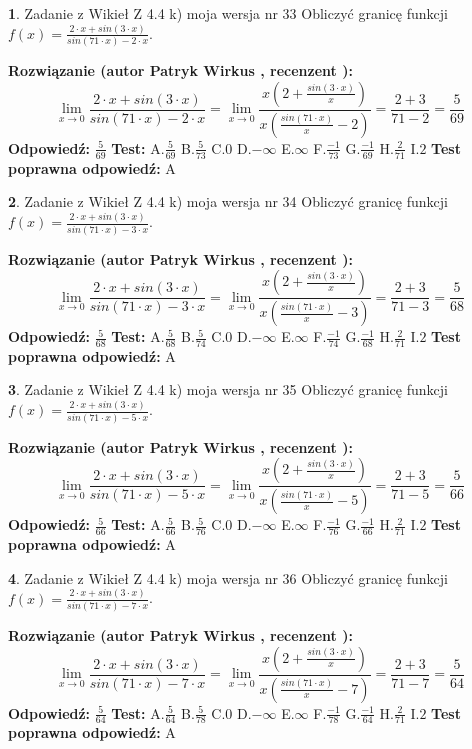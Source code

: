 \documentclass[12pt, a4paper]{article}
\theoremstyle{definition} %
\newtheorem{zad}{}
\newcommand{\zadStart}[1]{\begin{zad}#1\newline}
\newcommand{\zadStop}{\end{zad}}
\newcommand{\rozwStart}[2]{\noindent \textbf{Rozwiązanie (autor #1 , recenzent #2): }\newline}
\newcommand{\rozwStop}{\newline}
\newcommand{\odpStart}{\noindent \textbf{Odpowiedź:}\newline}
\newcommand{\odpStop}{\newline}
\newcommand{\testStart}{\noindent \textbf{Test:}\newline}
\newcommand{\testStop}{\newline}
\newcommand{\kluczStart}{\noindent \textbf{Test poprawna odpowiedź:}\newline}
\newcommand{\kluczStop}{\newline}
\begin{document}
\zadStart{Zadanie z Wikieł Z 4.4 k) moja wersja nr 33}
Obliczyć granicę funkcji $f(x)=\frac{2\cdot x +sin(3\cdot x)}{sin(71\cdot x) -2\cdot x}$.
\zadStop
\rozwStart{Patryk Wirkus}{}
$$\lim\limits_{x\to 0}\frac{2\cdot x +sin(3\cdot x)}{sin(71\cdot x) -2\cdot x}
=\lim\limits_{x\to 0}\frac{x(2+\frac{sin(3\cdot x)}{x})}{x(\frac{sin(71\cdot x)}{x}-2)}
=\frac{2+3}{71-2} = \frac{5}{69}$$
\rozwStop
\odpStart
$\frac{5}{69}$
\odpStop
\testStart
A.$\frac{5}{69}$
B.$\frac{5}{73}$
C.$0$
D.$-\infty$
E.$\infty$
F.$\frac{-1}{73}$
G.$\frac{-1}{69}$
H.$\frac{2}{71}$
I.$2$
\testStop
\kluczStart
A
\kluczStop



\zadStart{Zadanie z Wikieł Z 4.4 k) moja wersja nr 34}
Obliczyć granicę funkcji $f(x)=\frac{2\cdot x +sin(3\cdot x)}{sin(71\cdot x) -3\cdot x}$.
\zadStop
\rozwStart{Patryk Wirkus}{}
$$\lim\limits_{x\to 0}\frac{2\cdot x +sin(3\cdot x)}{sin(71\cdot x) -3\cdot x}
=\lim\limits_{x\to 0}\frac{x(2+\frac{sin(3\cdot x)}{x})}{x(\frac{sin(71\cdot x)}{x}-3)}
=\frac{2+3}{71-3} = \frac{5}{68}$$
\rozwStop
\odpStart
$\frac{5}{68}$
\odpStop
\testStart
A.$\frac{5}{68}$
B.$\frac{5}{74}$
C.$0$
D.$-\infty$
E.$\infty$
F.$\frac{-1}{74}$
G.$\frac{-1}{68}$
H.$\frac{2}{71}$
I.$2$
\testStop
\kluczStart
A
\kluczStop



\zadStart{Zadanie z Wikieł Z 4.4 k) moja wersja nr 35}
Obliczyć granicę funkcji $f(x)=\frac{2\cdot x +sin(3\cdot x)}{sin(71\cdot x) -5\cdot x}$.
\zadStop
\rozwStart{Patryk Wirkus}{}
$$\lim\limits_{x\to 0}\frac{2\cdot x +sin(3\cdot x)}{sin(71\cdot x) -5\cdot x}
=\lim\limits_{x\to 0}\frac{x(2+\frac{sin(3\cdot x)}{x})}{x(\frac{sin(71\cdot x)}{x}-5)}
=\frac{2+3}{71-5} = \frac{5}{66}$$
\rozwStop
\odpStart
$\frac{5}{66}$
\odpStop
\testStart
A.$\frac{5}{66}$
B.$\frac{5}{76}$
C.$0$
D.$-\infty$
E.$\infty$
F.$\frac{-1}{76}$
G.$\frac{-1}{66}$
H.$\frac{2}{71}$
I.$2$
\testStop
\kluczStart
A
\kluczStop



\zadStart{Zadanie z Wikieł Z 4.4 k) moja wersja nr 36}
Obliczyć granicę funkcji $f(x)=\frac{2\cdot x +sin(3\cdot x)}{sin(71\cdot x) -7\cdot x}$.
\zadStop
\rozwStart{Patryk Wirkus}{}
$$\lim\limits_{x\to 0}\frac{2\cdot x +sin(3\cdot x)}{sin(71\cdot x) -7\cdot x}
=\lim\limits_{x\to 0}\frac{x(2+\frac{sin(3\cdot x)}{x})}{x(\frac{sin(71\cdot x)}{x}-7)}
=\frac{2+3}{71-7} = \frac{5}{64}$$
\rozwStop
\odpStart
$\frac{5}{64}$
\odpStop
\testStart
A.$\frac{5}{64}$
B.$\frac{5}{78}$
C.$0$
D.$-\infty$
E.$\infty$
F.$\frac{-1}{78}$
G.$\frac{-1}{64}$
H.$\frac{2}{71}$
I.$2$
\testStop
\kluczStart
A
\kluczStop
\end{document}
